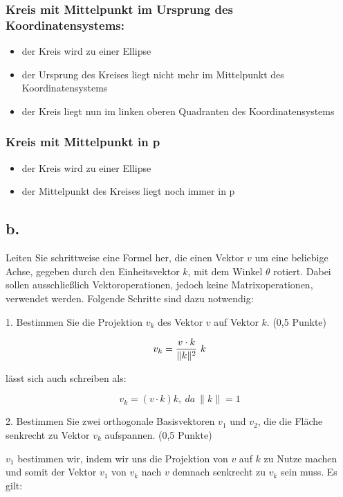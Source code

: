 \documentclass[12pt]{scrreprt}
\begin{document}
\subsubsection*{Kreis mit Mittelpunkt im Ursprung des Koordinatensystems:}

\begin{itemize}
  \item der Kreis wird zu einer Ellipse
  \item der Ursprung des Kreises liegt nicht mehr im Mittelpunkt des
Koordinatensystems
  \item der Kreis liegt nun im linken oberen Quadranten des Koordinatensystems
\end{itemize}

\subsubsection*{Kreis mit Mittelpunkt in p}

\begin{itemize}
  \item der Kreis wird zu einer Ellipse
  \item der Mittelpunkt des Kreises liegt noch immer in p
\end{itemize}


\subsection*{b.}

Leiten Sie schrittweise eine Formel her, die einen Vektor $v$ um eine beliebige Achse, gegeben durch den
Einheitsvektor $k$, mit dem Winkel $\theta$ rotiert. Dabei sollen ausschließlich Vektoroperationen, jedoch keine
Matrixoperationen, verwendet werden. Folgende Schritte sind dazu notwendig:

1. Bestimmen Sie die Projektion $v_k$ des Vektor $v$ auf Vektor $k$. (0,5 Punkte)

\[
	v_k = {v \cdot k \over \|k\|^2}~k
\]

lässt sich auch schreiben als:

\[
	v_k = (v \cdot k)k, ~da ~\| k \| = 1
\]

2. Bestimmen Sie zwei orthogonale Basisvektoren $v_1$ und $v_2$, die die Fläche senkrecht zu Vektor $v_k$
aufspannen. (0,5 Punkte)

$v_1$ bestimmen wir, indem wir uns die Projektion von $v$ auf $k$ zu Nutze machen und somit der Vektor $v_1$ von $v_k$ nach $v$ demnach senkrecht zu $v_k$ sein muss. Es gilt:
\end{document}

